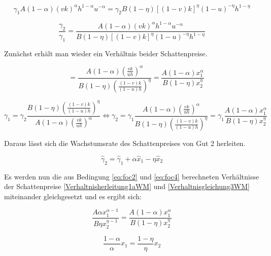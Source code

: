 	\begin{equation}
		\gamma_1A(1-\alpha)(vk)^{\alpha}h^{1-\alpha}u^{-\alpha}=\gamma_2B(1-\eta)[(1-v)k]^\eta (1-u)^{-\eta} h^{1-\eta}\label{foc4}
	\end{equation}


	\begin{equation}
		\frac{\gamma_2}{\gamma_1}=\frac{A(1-\alpha)(vk)^{\alpha}h^{1-\alpha}u^{-\alpha}}{B(1-\eta)[(1-v)k]^\eta (1-u)^{-\eta} h^{1-\eta}}
	\end{equation}


Zunächst erhält man wieder ein Verhältnis beider Schattenpreise. 

	
	\begin{equation}
		\quad~=\frac{A(1-\alpha)\left(\frac{vk}{uh}\right)^{\alpha}}{B(1-\eta)\left(\frac{(1-v)k}{(1-u)h}\right)^\eta}=\frac{A(1-\alpha)x_1^{\alpha}}{B(1-\eta)x_2^\eta}\label{Verhaltnisgleichung3WM}
	\end{equation}


	\begin{equation}
		\gamma_1=\gamma_2\frac{B(1-\eta)\left(\frac{(1-v)k}{(1-u)h}\right)^\eta}{A(1-\alpha)\left(\frac{vk}{uh}\right)^{\alpha}}\Longleftrightarrow \gamma_2=\gamma_1 \frac {A(1-\alpha)\left(\frac{vk}{uh}\right)^{\alpha}}{B(1-\eta)\left(\frac{(1-v)k}{(1-u)h}\right)^\eta} = \gamma_1 \frac {A(1-\alpha)x_1^{\alpha}}{B(1-\eta)x_2^\eta}\label{Verhaltnisgleichung3bWM}
	\end{equation}


Daraus lässt sich die Wachstumsrate des Schattenpreises von Gut 2 herleiten.


	\begin{equation}
		\hat{\gamma}_{2} = \hat{\gamma}_{1}+\alpha\hat{x}_1-\eta\hat{x}_2 \label{WachstumGamma2WM}
	\end{equation}


Es werden nun die aus Bedingung \eqref{eq:foc2} und \eqref{eq:foc4} berechneten Verhältnisse der Schattenpreise \eqref{Verhaltnisherleitung1aWM} und \eqref{Verhaltnisgleichung3WM} miteinander gleichgesetzt und es ergibt sich: 


	\begin{equation}
		\frac{A\alpha x_1^{\alpha-1}}{B\eta x_2^{\eta-1}}=\frac{A(1-\alpha)x_1^{\alpha}}{B(1-\eta)x_2^\eta}
	\end{equation}


	\begin{equation}
		\boxed{\frac{1-\alpha}{\alpha}x_1=\frac{1-\eta}{\eta}x_2}
	\end{equation}


